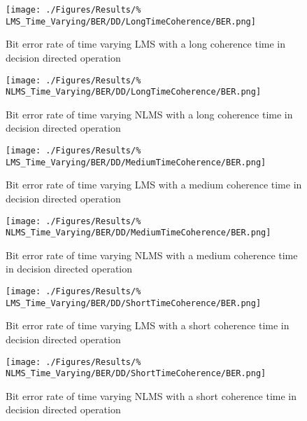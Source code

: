 \begin{figure}[ht]
	\centering
	\begin{minipage}{0.49\textwidth}
		\centering
		\texttt{[image: ./Figures/Results/\%
	LMS\_Time\_Varying/BER/DD/LongTimeCoherence/BER.png]}
		\captionsetup{width=0.75\linewidth}
		\caption{Bit error rate of time varying LMS with a 
		long coherence time in decision directed 
		operation}
	\end{minipage}
	\begin{minipage}{0.49\textwidth}
		\centering
		\texttt{[image: ./Figures/Results/\%
	NLMS\_Time\_Varying/BER/DD/LongTimeCoherence/BER.png]}
		\captionsetup{width=0.75\linewidth}
		\caption{Bit error rate of time varying NLMS with a 
		long coherence time in decision directed 
		operation}
		\label{fig:NLMS-BER-Long-DD-TV}
	\end{minipage}
\end{figure}

\begin{figure}[ht]
	\centering
	\begin{minipage}{0.49\textwidth}
		\centering
		\texttt{[image: ./Figures/Results/\%
	LMS\_Time\_Varying/BER/DD/MediumTimeCoherence/BER.png]}
		\captionsetup{width=0.75\linewidth}
		\caption{Bit error rate of time varying LMS with a 
		medium coherence time in decision directed 
		operation}
	\end{minipage}
	\begin{minipage}{0.49\textwidth}
		\centering
		\texttt{[image: ./Figures/Results/\%
	NLMS\_Time\_Varying/BER/DD/MediumTimeCoherence/BER.png]}
		\captionsetup{width=0.75\linewidth}
		\caption{Bit error rate of time varying NLMS with a 
		medium coherence time in decision directed operation}
	\end{minipage}
\end{figure}

\begin{figure}[ht]
	\centering
	\begin{minipage}{0.49\textwidth}
		\centering
		\texttt{[image: ./Figures/Results/\%
	LMS\_Time\_Varying/BER/DD/ShortTimeCoherence/BER.png]}
		\captionsetup{width=0.75\linewidth}
		\caption{Bit error rate of time varying LMS with a 
		short coherence time in decision directed operation}
	\end{minipage}
	\begin{minipage}{0.49\textwidth}
		\centering
		\texttt{[image: ./Figures/Results/\%
	NLMS\_Time\_Varying/BER/DD/ShortTimeCoherence/BER.png]}
		\captionsetup{width=0.75\linewidth}
		\caption{Bit error rate of time varying NLMS with a 
		short coherence time in decision directed operation}
	\end{minipage}
\end{figure}

